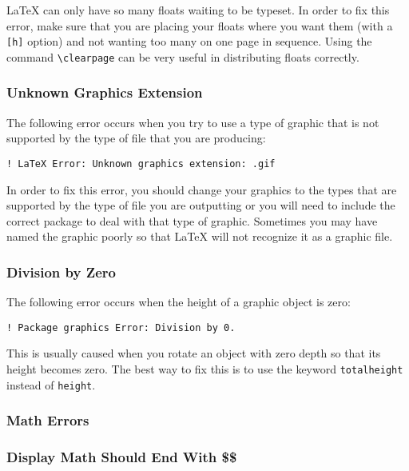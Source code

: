 \LaTeX{} can only have so many floats waiting to be typeset.  In order
to fix this error, make sure that you are placing your floats where
you want them (with a \texttt{[h]} option) and not wanting too many on
one page in sequence.  Using the command \verb|\clearpage| can be very
useful in distributing floats correctly.

\subsubsection{Unknown Graphics Extension}
\label{sec:unkn-graph-extens}

The following error occurs when you try to use a type of graphic that
is not supported by the type of file that you are producing:
\begin{verbatim}
! LaTeX Error: Unknown graphics extension: .gif
\end{verbatim}

In order to fix this error, you should change your graphics to the
types that are supported by the type of file you are outputting or you
will need to include the correct package to deal with that type of
graphic.  Sometimes you may have named the graphic poorly so that
\LaTeX{} will not recognize it as a graphic file.

\subsubsection{Division by Zero}
\label{sec:division-zero}

The following error occurs when the height of a graphic object is zero:
\begin{verbatim}
! Package graphics Error: Division by 0.
\end{verbatim}

This is usually caused when you rotate an object with zero depth so
that its height becomes zero.  The best way to fix this is to use the
keyword \texttt{totalheight} instead of \texttt{height}.

\subsubsection{Math Errors}
\label{sec:math-errors}

\subsubsection{Display Math Should End With \$\$}
\label{sec:display-math-should}

